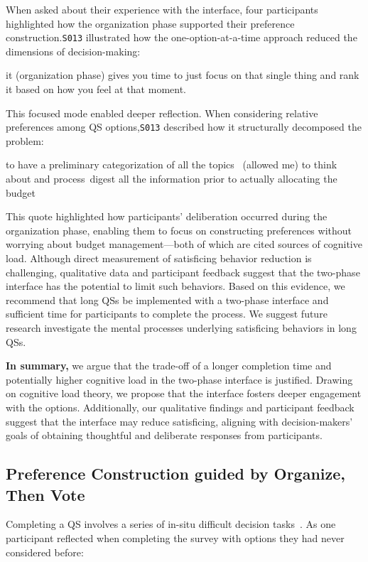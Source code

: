 {When asked about their experience with the interface, four participants highlighted how the organization phase supported their preference construction.\texttt{S013} illustrated how the one-option-at-a-time approach reduced the dimensions of decision-making:

\begin{displayquote}  
\bracketellipsis it (organization phase) gives you time to just focus on that single thing and rank it based on how you feel at that moment. \hfill{}  
\end{displayquote}  

This focused mode enabled deeper reflection. When considering relative preferences among QS options,\texttt{S013} described how it structurally decomposed the problem:

\begin{displayquote}  
\bracketellipsis to have a preliminary categorization of all the topics ~\bracketellipsis (allowed me) to think about and process~\bracketellipsis digest all the information prior to actually allocating the budget~\bracketellipsis \hfill{}  
\end{displayquote}  

This quote highlighted how participants' deliberation occurred during the organization phase, enabling them to focus on constructing preferences without worrying about budget management—both of which are cited sources of cognitive load. Although direct measurement of satisficing behavior reduction is challenging, qualitative data and participant feedback suggest that the two-phase interface has the potential to limit such behaviors. Based on this evidence, we recommend that long QSs be implemented with a two-phase interface and sufficient time for participants to complete the process. We suggest future research investigate the mental processes underlying satisficing behaviors in long QSs. 

\textbf{In summary,} we argue that the trade-off of a longer completion time and potentially higher cognitive load in the two-phase interface is justified. Drawing on cognitive load theory, we propose that the interface fosters deeper engagement with the options. Additionally, our qualitative findings and participant feedback suggest that the interface may reduce satisficing, aligning with decision-makers' goals of obtaining thoughtful and deliberate responses from participants.

\subsection{Preference Construction guided by Organize, Then Vote}
Completing a QS involves a series of in-situ difficult decision tasks~\citet{lichtensteinConstructionPreference2006}. As one participant reflected when completing the survey with options they had never considered before:

}
